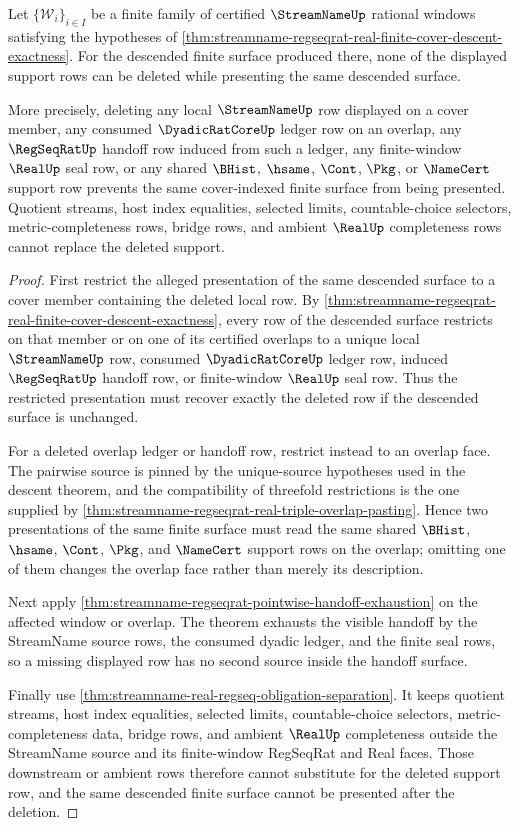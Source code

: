 \begin{theorem}
\label{thm:streamname-regseqrat-real-finite-cover-descent-support-minimality}
Let $\{\mathcal{W}_i\}_{i\in I}$ be a finite family of certified
$\StreamNameUp$ rational windows satisfying the hypotheses of
\autoref{thm:streamname-regseqrat-real-finite-cover-descent-exactness}. For
the descended finite surface produced there, none of the displayed support
rows can be deleted while presenting the same descended surface.

More precisely, deleting any local $\StreamNameUp$ row displayed on a cover
member, any consumed $\DyadicRatCoreUp$ ledger row on an overlap, any
$\RegSeqRatUp$ handoff row induced from such a ledger, any finite-window
$\RealUp$ seal row, or any shared $\BHist$, $\hsame$, $\Cont$, $\Pkg$, or
$\NameCert$ support row prevents the same cover-indexed finite surface from
being presented. Quotient streams, host index equalities, selected limits,
countable-choice selectors, metric-completeness rows, bridge rows, and ambient
$\RealUp$ completeness rows cannot replace the deleted support.
\end{theorem}
\begin{proof}
First restrict the alleged presentation of the same descended surface to a
cover member containing the deleted local row. By
\autoref{thm:streamname-regseqrat-real-finite-cover-descent-exactness}, every
row of the descended surface restricts on that member or on one of its
certified overlaps to a unique local $\StreamNameUp$ row, consumed
$\DyadicRatCoreUp$ ledger row, induced $\RegSeqRatUp$ handoff row, or
finite-window $\RealUp$ seal row. Thus the restricted presentation must
recover exactly the deleted row if the descended surface is unchanged.

For a deleted overlap ledger or handoff row, restrict instead to an overlap
face. The pairwise source is pinned by the unique-source hypotheses used in
the descent theorem, and the compatibility of threefold restrictions is the
one supplied by
\autoref{thm:streamname-regseqrat-real-triple-overlap-pasting}. Hence two
presentations of the same finite surface must read the same shared
$\BHist$, $\hsame$, $\Cont$, $\Pkg$, and $\NameCert$ support rows on the
overlap; omitting one of them changes the overlap face rather than merely its
description.

Next apply
\autoref{thm:streamname-regseqrat-pointwise-handoff-exhaustion} on the
affected window or overlap. The theorem exhausts the visible handoff by the
StreamName source rows, the consumed dyadic ledger, and the finite seal rows,
so a missing displayed row has no second source inside the handoff surface.

Finally use \autoref{thm:streamname-real-regseq-obligation-separation}. It
keeps quotient streams, host index equalities, selected limits,
countable-choice selectors, metric-completeness data, bridge rows, and
ambient $\RealUp$ completeness outside the StreamName source and its
finite-window RegSeqRat and Real faces. Those downstream or ambient rows
therefore cannot substitute for the deleted support row, and the same
descended finite surface cannot be presented after the deletion.
\end{proof}
